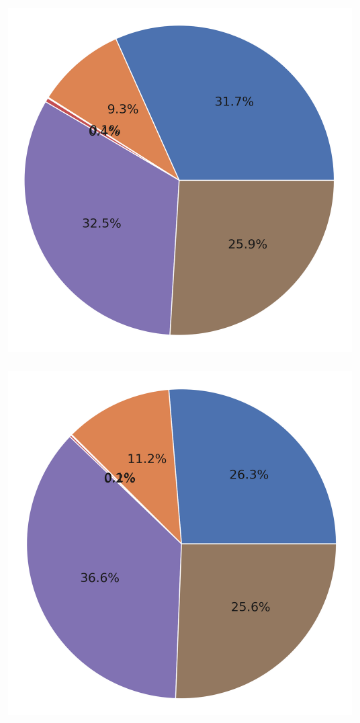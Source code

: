 \begin{figure}  [ht!]
\begin{subfigure}{0.235\textwidth}
    \includegraphics[width=0.8\linewidth]{figs/plots/gslddim-5-500_emotion_Emotion.png}
  \end{subfigure}\hfill
  \begin{subfigure}{0.235\textwidth}
  \centering
    \includegraphics[width=0.8\linewidth]{figs/plots/ddim-5-800_emotion_Emotion.png}
  \end{subfigure}\vfill
  \begin{subfigure}{0.25\textwidth}

\end{subfigure}
\end{figure}
